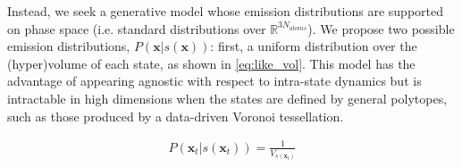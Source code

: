 \documentclass[journal=jpcbfk, layout=traditional, manuscript=article]{achemso}
\begin{document}
Instead, we seek a generative model whose emission distributions are supported on phase space (i.e. standard distributions over $\mathbb{R}^{3N_{atoms}}$). We propose two possible emission distributions, $P(\mathbf{x} | s(\mathbf{x}))$: first, a uniform distribution over the (hyper)volume of each state, as shown in \cref{eq:like_vol}. This model has the advantage of appearing agnostic with respect to intra-state dynamics but is intractable in high dimensions when the states are defined by general polytopes, such as those produced by a data-driven Voronoi tessellation. 
 

 
\begin{equation}
\label{eq:like_vol}
\begin{split}
 P(\mathbf{x}_t | s(\mathbf{x}_t)) = \frac{1}{V_{s(\mathbf{x}_{t})}}
\end{split}
\end{equation} 
\end{document}
